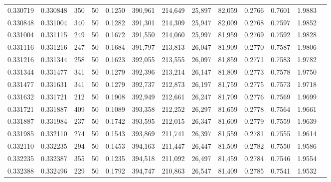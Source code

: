 \begin{tabular}{rrrrrrrrrrrrr}
0.330719 & 0.330848 &   350 &  50 &                                     0.1250 & 390,961 & 214,649 &  25,897 &  82,059 & 0.2766 & 0.7601 & 1.9883 \\
0.330848 & 0.331004 &   340 &  50 &                                     0.1282 & 391,301 & 214,309 &  25,947 &  82,009 & 0.2768 & 0.7597 & 1.9852 \\
0.331004 & 0.331115 &   249 &  50 &                                     0.1672 & 391,550 & 214,060 &  25,997 &  81,959 & 0.2769 & 0.7592 & 1.9828 \\
0.331116 & 0.331216 &   247 &  50 &                                     0.1684 & 391,797 & 213,813 &  26,047 &  81,909 & 0.2770 & 0.7587 & 1.9806 \\
0.331216 & 0.331344 &   258 &  50 &                                     0.1623 & 392,055 & 213,555 &  26,097 &  81,859 & 0.2771 & 0.7583 & 1.9782 \\
0.331344 & 0.331477 &   341 &  50 &                                     0.1279 & 392,396 & 213,214 &  26,147 &  81,809 & 0.2773 & 0.7578 & 1.9750 \\
0.331477 & 0.331631 &   341 &  50 &                                     0.1279 & 392,737 & 212,873 &  26,197 &  81,759 & 0.2775 & 0.7573 & 1.9718 \\
0.331632 & 0.331721 &   212 &  50 &                                     0.1908 & 392,949 & 212,661 &  26,247 &  81,709 & 0.2776 & 0.7569 & 1.9699 \\
0.331721 & 0.331887 &   409 &  50 &                                     0.1089 & 393,358 & 212,252 &  26,297 &  81,659 & 0.2778 & 0.7564 & 1.9661 \\
0.331887 & 0.331984 &   237 &  50 &                                     0.1742 & 393,595 & 212,015 &  26,347 &  81,609 & 0.2779 & 0.7559 & 1.9639 \\
0.331985 & 0.332110 &   274 &  50 &                                     0.1543 & 393,869 & 211,741 &  26,397 &  81,559 & 0.2781 & 0.7555 & 1.9614 \\
0.332110 & 0.332235 &   294 &  50 &                                     0.1453 & 394,163 & 211,447 &  26,447 &  81,509 & 0.2782 & 0.7550 & 1.9586 \\
0.332235 & 0.332387 &   355 &  50 &                                     0.1235 & 394,518 & 211,092 &  26,497 &  81,459 & 0.2784 & 0.7546 & 1.9554 \\
0.332388 & 0.332496 &   229 &  50 &                                     0.1792 & 394,747 & 210,863 &  26,547 &  81,409 & 0.2785 & 0.7541 & 1.9532 \\

\end{tabular}
